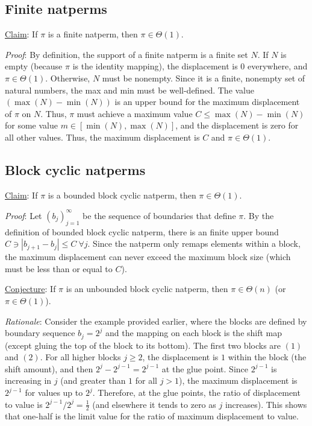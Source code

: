 \documentclass[12pt,reqno]{article}
\begin{document}
\subsection{Finite natperms}

\underline{Claim}: If $\pi$ is a finite natperm, then $\pi \in \Theta(1)$.

\textit{Proof}: By definition, the support of a finite natperm is a finite set $N$. If $N$ is empty (because $\pi$ is the identity mapping), the displacement is $0$ everywhere, and $\pi \in \Theta(1)$. Otherwise, $N$ must be nonempty. Since it is a finite, nonempty set of natural numbers, the max and min must be well-defined. The value $(\max(N) - \min(N))$ is an upper bound for the maximum displacement of $\pi$ on $N$. Thus, $\pi$ must achieve a maximum value $C \leq \max(N) - \min(N)$ for some value $m \in [ \min(N), \max(N) ] $, and the displacement is zero for all other values. Thus, the maximum displacement is $C$ and $\pi \in \Theta(1)$.

\subsection{Block cyclic natperms}

\underline{Claim}: If $\pi$ is a bounded block cyclic natperm, then $\pi \in \Theta(1)$.

\textit{Proof}: Let $(b_j)_{j=1}^{\infty}$ be the sequence of boundaries that define $\pi$. By the definition of bounded block cyclic natperm, there is an finite upper bound $C \ni | b_{j+1} - b_j | \leq C \  \forall j$. Since the natperm only remaps elements within a block, the maximum displacement can never exceed the maximum block size (which must be less than or equal to $C$).

\underline{Conjecture}: If $\pi$ is an unbounded block cyclic natperm, then $\pi \in \Theta(n)$ (or $\pi \in \Theta(1)$).

\textit{Rationale}: Consider the example provided earlier, where the blocks are defined by boundary sequence $b_j = 2^j$ and the mapping on each block is the shift map (except gluing the top of the block to its bottom). The first two blocks are $(1)$ and $(2)$. For all higher blocks $j \geq 2$, the displacement is $1$ within the block (the shift amount), and then $2^j - 2^{j-1} = 2^{j-1}$ at the glue point. Since $2^{j-1}$ is increasing in $j$ (and greater than $1$ for all $j > 1$), the maximum displacement is $2^{j-1}$ for values up to $2^j$. Therefore, at the glue points, the ratio of displacement to value is $2^{j-1} / 2^j = \frac{1}{2}$ (and elsewhere it tends to zero as $j$ increases). This shows that one-half is the limit value for the ratio of maximum displacement to value.
\end{document}
